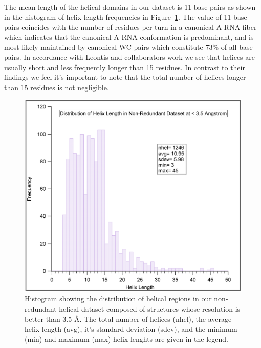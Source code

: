 The mean length of the helical domains in our dataset is 11 base pairs
as   shown  in   the  histogram   of  helix   length   frequencies  in
Figure~\ref{fig:hellength}.  The value of 11 base pairs coincides with
the  number  of   residues  per  turn  in  a   canonical  A-RNA  fiber
\cite{arnott1968}   which   indicates   that   the   canonical   A-RNA
conformation  is  predominant,  and   is  most  likely  maintained  by
canonical  WC pairs  which  constitute  73\% of  all  base pairs.   In
accordance with Leontis  and collaborators work \cite{nasalean2009} we
see that helices are usually  short and less frequently longer than 15
residues. In contrast to their findings we feel it's important to note
that  the total  number  of helices  longer  than 15  residues is  not
negligible.

\begin{figure}
\centering
\includegraphics[angle=0, scale=0.5]{Chapter3/heldistrib.png}
\caption{Histogram showing the distribution  of helical regions in our
  non-redundant   helical  dataset   composed   of  structures   whose
  resolution  is better  than 3.5  \AA.  The  total number  of helices
  (nhel),  the average  helix  length (avg),  it's standard  deviation
  (sdev), and the  minimum (min) and maximum (max)  helix lenghts are
  given in the legend.}
\label{fig:hellength}
\end{figure}


